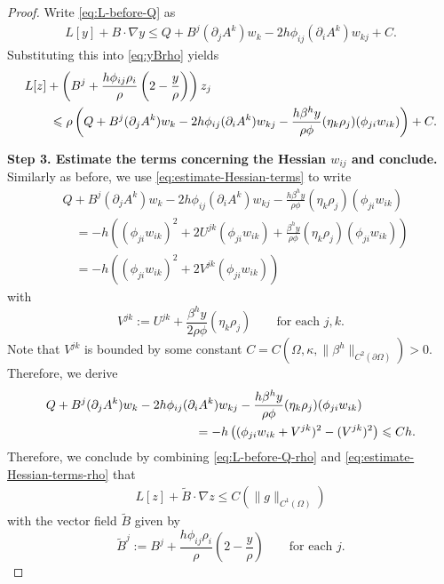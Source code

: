 \documentclass[11pt]{article}
\numberwithin{equation}{section}
\def\le{\leqslant}
\def\leq{\leqslant}
\begin{document}
\begin{proof}
Write \eqref{eq:L-before-Q} as
\begin{align*}
L[y] + B \cdot \nabla y \leq Q  + B^j (\partial_j A^k) w_k - 2h\phi_{ij}(\partial_iA^k)w_{kj} + C.
\end{align*}
Substituting this into \eqref{eq:yBrho} yields
\begin{align}
&L[z] + \left(B^j + \frac{h\phi_{ij}\rho_i}{\rho}\left(2-\frac{y}{\rho}\right)\right)z_j \notag \\
&\qquad\le \rho \left(Q  + B^j (\partial_j A^k) w_k - 2h\phi_{ij}(\partial_iA^k)w_{kj} - \frac{h\beta^h y}{\rho\phi}(\eta_k \rho_j) (\phi_{ji} w_{ik})\right)+ C. \label{eq:L-before-Q-rho}
\end{align}

\medskip

\textbf{Step 3. Estimate the terms concerning the Hessian $w_{ij}$ and conclude.} Similarly as before, we use \eqref{eq:estimate-Hessian-terms} to write
\begin{align*}
&Q + B^j (\partial_j A^k) w_k - 2h\phi_{ij}(\partial_iA^k)w_{kj} - \frac{h\beta^h y}{\rho\phi}(\eta_k \rho_j) (\phi_{ji} w_{ik}) \\
&\quad=-h\left((\phi_{ji}w_{ik})^2 + 2U^{jk}(\phi_{ji}w_{ik}) + \frac{\beta^h y}{\rho\phi}(\eta_k \rho_j) (\phi_{ji} w_{ik})\right) \\
&\quad=-h\left((\phi_{ji}w_{ik})^2 + 2V^{jk}(\phi_{ji}w_{ik})\right)
\end{align*}
with
\[
V^{jk} := U^{jk} + \frac{\beta^h y}{2\rho\phi}(\eta_k \rho_j)\qquad\text{for each }j,k.
\]
Note that $V^{jk}$ is bounded by some constant $C=C(\Omega,\kappa,\|\beta^h\|_{C^2(\partial\Omega)})>0$. Therefore, we derive
\begin{align}
&Q + B^j (\partial_j A^k) w_k - 2h\phi_{ij}(\partial_iA^k)w_{kj} - \frac{h\beta^h y}{\rho\phi}(\eta_k \rho_j) (\phi_{ji} w_{ik}) \notag \\
&\qquad\qquad\qquad\qquad\qquad\qquad= -h\left((\phi_{ji}w_{ik}+V^{jk})^2-(V^{jk})^2\right) \leq Ch \label{eq:estimate-Hessian-terms-rho}.
\end{align}
Therefore, we conclude by combining \eqref{eq:L-before-Q-rho} and \eqref{eq:estimate-Hessian-terms-rho} that
\begin{align*}
L[z] + \widetilde{B}\cdot\nabla z \le C(\|g\|_{C^1(\Omega)})
\end{align*}
with the vector field $\widetilde{B}$ given by
\[
\widetilde{B}^j := B^j + \frac{h\phi_{ij}\rho_i}{\rho}\left(2-\frac{y}{\rho}\right)\qquad\text{for each }j.
\]
\end{proof}
\end{document}
